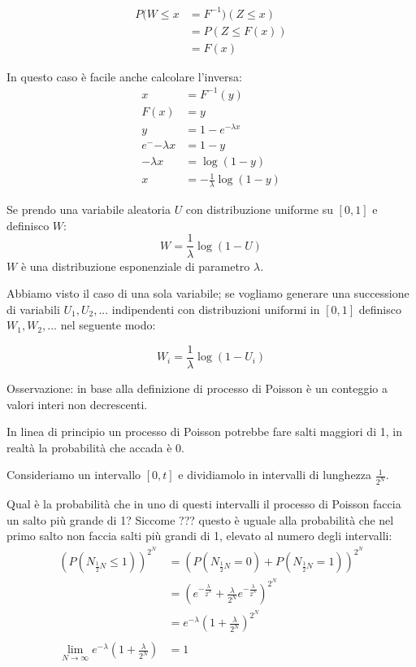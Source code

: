 \documentclass[a4paper,12pt]{book}
\begin{document}
\begin{align*}
	P(W \le x & = F^{-1})(Z \le x) \\
	& = P(Z \le F(x)) \\
	& = F(x)
\end{align*}

In questo caso è facile anche calcolare l'inversa:
\begin{align*}
	x & = F^{-1}(y) \\
	F(x) & = y \\ %
	y & = 1 - e^{-\lambda x} \\
	e^-{-\lambda x} & = 1 - y \\
	-\lambda x & = \log(1-y) \\
	x & = - \frac{1}{\lambda} \log (1-y)
\end{align*}

Se prendo una variabile aleatoria $ U $ con distribuzione uniforme su $ [0,1] $ e definisco $ W $:
$$ W = \frac{1}{\lambda} \log(1 - U) $$
$ W $ è una distribuzione esponenziale di parametro $\lambda$.

Abbiamo visto il caso di una sola variabile; se vogliamo generare una successione di variabili $ U_1, U_2, ... $ indipendenti con distribuzioni uniformi in $ [0,1] $ definisco $ W_1, W_2, ... $ nel seguente modo:

$$ W_i = \frac{1}{\lambda} \log(1 - U_i) $$

Osservazione: in base alla definizione di processo di Poisson è un conteggio a valori interi non decrescenti. %

In linea di principio un processo di Poisson potrebbe fare salti maggiori di 1, in realtà la probabilità che accada è 0. 

Consideriamo un intervallo $ [0,t] $ e dividiamolo in intervalli di lunghezza $\frac{1}{2^N}$.

Qual è la probabilità che in uno di questi intervalli il processo di Poisson faccia un salto più grande di 1? Siccome ??? %
 questo è uguale alla probabilità che nel primo salto non faccia salti più grandi di 1, elevato al numero degli intervalli:
\begin{align*}
	(P(N_{\frac{1}{2}N} \le 1))^{2^N} & = (P(N_{\frac{1}{2}N} = 0) + P(N_{\frac{1}{2}N} = 1) )^{2^N} \\
	& = ( e^{-\frac{\lambda}{2^N}} + \frac{\lambda}{2^N}e^{-\frac{\lambda}{2^N}}  )^{2^N} \\
	& = e^{-\lambda}(1 + \frac{\lambda}{2^N})^{2^N} \\
	\\
	\lim\limits_{N \to \infty} e^{-\lambda}(1 + \frac{\lambda}{2^N}) & = 1
\end{align*}
\end{document}
